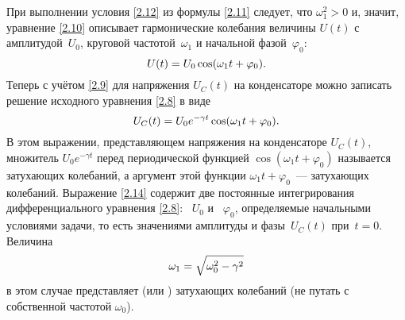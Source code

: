 При выполнении условия
\eqref{2.12} из формулы \eqref{2.11} следует, что $\omega_1^2>0$ и, значит,
уравнение \eqref{2.10} описывает гармонические колебания величины $U(t)$ с
амплитудой~$U_0$, круговой частотой~$\omega_1$ и начальной фазой~$\varphi_0$:
\begin{equation*}\eqmark{2.13}
U(t)=U_0\cos(\omega_1t+\varphi_0).
\end{equation*}
Теперь с учётом \eqref{2.9} для напряжения $U_C(t)$ на конденсаторе
можно записать решение исходного уравнения \eqref{2.8} в виде
\begin{equation}\eqmark{2.14}
U_C(t)=U_0e^{-\gamma t}\cos(\omega_1t+\varphi_0).
\end{equation}
В этом выражении, представляющем  напряжения на
конденсаторе $U_C(t)$, множитель $U_0 e^{-\gamma t}$ перед периодической функцией
$\cos(\omega_1 t+\varphi_0)$ называется  затухающих
колебаний, а аргумент этой функции $\omega_1t+\varphi_0$~---  затухающих
колебаний. Выражение \eqref{2.14} содержит две постоянные интегрирования
дифференциального уравнения \eqref{2.8}: ~$U_0$ и
~$\varphi_0$, определяемые начальными условиями
задачи, то есть значениями амплитуды и фазы~$U_C(t)$ при~$t=0$. Величина
\begin{equation}\eqmark{2.15}
\omega_1=\sqrt{\omega_0^2-\gamma^2}
\end{equation}
в этом случае представляет  (или
) затухающих колебаний 
(не путать с собственной частотой $\omega_0$).

